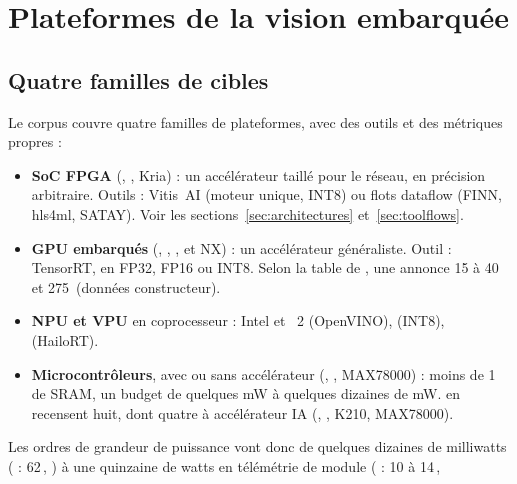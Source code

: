 \section{Plateformes de la vision embarquée}
\label{sec:plateformes}

\subsection{Quatre familles de cibles}

Le corpus couvre quatre familles de plateformes, avec des outils et des métriques propres :
\begin{itemize}
  \item \textbf{SoC FPGA} (, , Kria) : un accélérateur taillé pour
    le réseau, en précision arbitraire. Outils : Vitis~AI (moteur unique, INT8) ou flots
    dataflow (FINN, hls4ml, SATAY). Voir les sections~\ref{sec:architectures}
    et~\ref{sec:toolflows}.
  \item \textbf{GPU embarqués} (, , ,  et NX) : un
    accélérateur généraliste. Outil : TensorRT, en FP32, FP16 ou INT8. Selon la table de
    \citet[Table~4]{arxiv-2411.01431-efficient-deep-learning-infrastructures-embedded},
    une  annonce 15 à 40\, et 275\, (données constructeur).
  \item \textbf{NPU et VPU} en coprocesseur : Intel  et ~2 (OpenVINO),
      (INT8),  (HailoRT).
  \item \textbf{Microcontrôleurs}, avec ou sans accélérateur (, , MAX78000) : moins
    de 1\, de SRAM, un budget de quelques mW à quelques dizaines de mW.
    \citet[Table~4]{2025-el-zeinaty-designing-object-detection-models-tinyml} en recensent
    huit, dont quatre à accélérateur IA (, , K210, MAX78000).
\end{itemize}
Les ordres de grandeur de puissance vont donc de quelques dizaines de milliwatts ( :
62\,, \citealp[§V-D]{arxiv-2110.10486-tinyml-platform-device-continual-learning}) à
une quinzaine de watts en télémétrie de module ( : 10 à 14\,,
